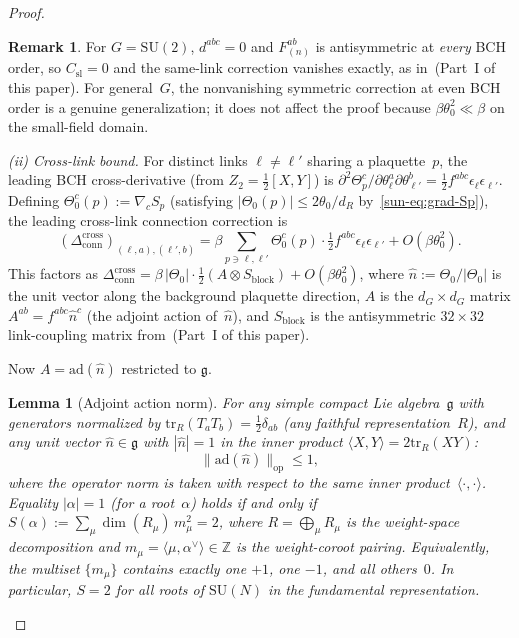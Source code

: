 \documentclass[11pt]{article}
\newtheorem{lemma}[theorem]{Lemma}
\theoremstyle{definition}
\newtheorem{remark}[theorem]{Remark}
\newcommand{\SU}{\mathrm{SU}}
\newcommand{\tr}{\mathrm{tr}}
\newcommand{\Z}{\mathbb{Z}}
\newcommand{\ad}{\mathrm{ad}}
\newcommand{\fg}{\mathfrak{g}}
\begin{document}
\begin{proof}
\begin{remark}
For $G=\SU(2)$, $d^{abc}=0$ and $F^{ab}_{(n)}$ is
antisymmetric at \emph{every} BCH order, so
$C_{\mathrm{sl}}=0$ and the same-link correction
vanishes exactly, as in~\textup{(Part~I of this paper)}.
For general~$G$, the nonvanishing symmetric correction
at even BCH order is a genuine generalization;
it does not affect the proof because
$\beta\theta_0^2\ll\beta$ on the small-field domain.
\end{remark}

\emph{(ii) Cross-link bound.}
For distinct links $\ell\ne\ell'$ sharing a plaquette~$p$,
the leading BCH cross-derivative (from $Z_2=\frac{1}{2}[X,Y]$)
is
$\partial^2\Theta_p^c/\partial\theta_\ell^a
\partial\theta_{\ell'}^b
=\tfrac{1}{2}f^{abc}\epsilon_\ell\epsilon_{\ell'}$.
Defining $\Theta_0^c(p):=\nabla_c S_p$
(satisfying $|\Theta_0(p)|\le 2\theta_0/d_R$
by~\eqref{sun-eq:grad-Sp}),
the leading cross-link connection correction is
\begin{equation}\label{sun-eq:chr-crosslink}
(\Delta_{\mathrm{conn}}^{\text{cross}})_{(\ell,a),(\ell',b)}
=\beta\sum_{p\ni\ell,\ell'}\Theta_0^c(p)\cdot
\tfrac{1}{2}f^{abc}\epsilon_\ell\epsilon_{\ell'}
+O(\beta\theta_0^2).
\end{equation}
This factors as
$\Delta_{\mathrm{conn}}^{\text{cross}}
=\beta\,|\Theta_0|\cdot\tfrac{1}{2}(A\otimes S_{\mathrm{block}})
+O(\beta\theta_0^2)$,
where $\hat{n}:=\Theta_0/|\Theta_0|$ is the unit vector
along the background plaquette direction,
$A$ is the $d_G\times d_G$ matrix
$A^{ab}=f^{abc}\hat{n}^c$ (the adjoint action
of~$\hat{n}$), and
$S_{\mathrm{block}}$ is the antisymmetric
$32\times 32$ link-coupling matrix
from~(Part~I of this paper).

Now $A=\ad(\hat{n})$ restricted to $\fg$.

\begin{lemma}[Adjoint action norm]\label{sun-lem:ad-norm}
For any simple compact Lie algebra~$\fg$ with generators
normalized by $\tr_R(T_a T_b)=\frac{1}{2}\delta_{ab}$
(any faithful representation~$R$), and any unit vector
$\hat{n}\in\fg$ with $|\hat{n}|=1$ in the inner product
$\langle X,Y\rangle=2\tr_R(XY)$:
\begin{equation}
\|\ad(\hat{n})\|_{\mathrm{op}}\le 1,
\end{equation}
where the operator norm is taken with respect to the
same inner product~$\langle\cdot,\cdot\rangle$.
Equality $|\alpha|=1$ (for a root~$\alpha$) holds if
and only if $S(\alpha):=\sum_\mu\dim(R_\mu)\,m_\mu^2=2$,
where $R=\bigoplus_\mu R_\mu$ is the weight-space
decomposition and
$m_\mu=\langle\mu,\alpha^\vee\rangle\in\Z$ is the
weight-coroot pairing.  Equivalently, the multiset
$\{m_\mu\}$ contains exactly
one $+1$, one $-1$, and all others~$0$.
In particular, $S=2$ for all roots of
$\SU(N)$ in the fundamental representation.
\end{lemma}


\end{proof}
\end{document}
